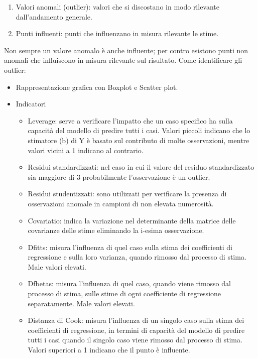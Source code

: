 \documentclass[a4page, 11pt]{article}
\begin{document}
\begin{enumerate}[noitemsep]
\item Valori anomali (outlier): valori che si discostano in modo rilevante dall’andamento generale.
\item Punti influenti: punti che influenzano in misura rilevante le stime.
\end{enumerate}
Non sempre un valore anomalo è anche influente; per contro esistono punti non anomali che influiscono in misura rilevante sul risultato.
\newline
\newline
Come identificare gli outlier:
\begin{itemize}[noitemsep]
\item Rappresentazione grafica con Boxplot e Scatter plot.
\item Indicatori
	\begin{itemize}[noitemsep]
	\item Leverage: serve a verificare l’impatto che un caso specifico ha sulla capacità del modello di predire tutti i casi. Valori piccoli indicano che lo stimatore (b) di Y è basato sul contributo di molte osservazioni, mentre valori vicini a 1 indicano al contrario.
	\item Residui standardizzati: nel caso in cui il valore del residuo standardizzato sia maggiore di 3 probabilmente l’osservazione è un outlier.
	\item Residui studentizzati: sono utilizzati per verificare la presenza di osservazioni anomale in campioni di non elevata numerosità.
	\item Covariatio: indica la variazione nel determinante della matrice delle covarianze delle stime eliminando la i-esima osservazione.
	\item Dfitts: misura l’influenza di quel caso sulla stima dei coefficienti di regressione e sulla loro varianza, quando rimosso dal processo di stima. Male valori elevati.
	\item Dfbetas: misura l’influenza di quel caso, quando viene rimosso dal processo di stima, sulle stime di ogni coefficiente di regressione separatamente. Male valori elevati.
	\item Distanza di Cook: misura l’influenza di un singolo caso sulla stima dei coefficienti di regressione, in termini di capacità del modello di predire tutti i casi quando il singolo caso viene rimosso dal processo di stima. Valori superiori a 1 indicano che il punto è influente.
	\end{itemize}
\end{itemize}
\end{document}
